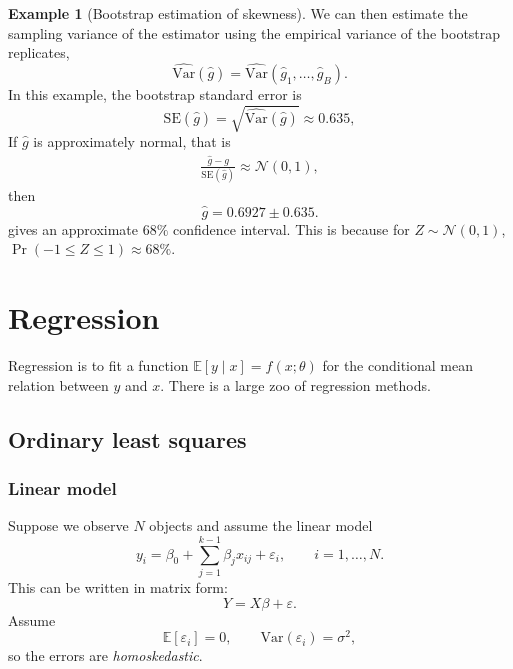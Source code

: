 \documentclass[11pt, titlepage]{article} %
\numberwithin{equation}{section}
\theoremstyle{definition}
\newtheorem*{example*}{Example}
\numberwithin{assumption}{section}
\begin{document}
\begin{example*}[Bootstrap estimation of skewness]
We can then estimate the sampling variance of the estimator using the empirical variance of the bootstrap replicates,
\begin{equation*}
    \widehat{\mathrm{Var}}(\hat g)
    =
    \widehat{\mathrm{Var}}(\hat g_1,\dots,\hat g_B).
\end{equation*}
In this example, the bootstrap standard error is
\begin{equation*}
    \mathrm{SE}(\hat g)=\sqrt{\widehat{\mathrm{Var}}(\hat g)}\approx 0.635,
\end{equation*}
If $\hat g$ is approximately normal, that is
\begin{align*}
    \frac{\hat g-g}{\mathrm{SE}(\hat g)}\approx\mathcal{N}(0,1),
\end{align*}
then
\begin{equation*}
    \hat g = 0.6927 \pm 0.635.
\end{equation*}
gives an approximate $68\%$ confidence interval. This is because for $Z\sim\mathcal{N}(0,1)$, $\Pr(-1\le Z\le 1)\approx68\%$.




\end{example*}

\section{Regression}

Regression is to fit a function $\mathbb{E}[y\mid x]=f(x;\theta)$
for the conditional mean relation between $y$ and $x$.
There is a large zoo of regression methods. 

\subsection{Ordinary least squares}

\subsubsection*{Linear model}

Suppose we observe $N$ objects and assume the linear model
\begin{equation*}
    y_i=\beta_0+\sum_{j=1}^{k-1}\beta_j x_{ij}+\varepsilon_i,
    \qquad i=1,\dots,N.
\end{equation*}
This can be written in matrix form:
\begin{equation*}
    Y=X\beta+\varepsilon.
\end{equation*}
Assume
\begin{equation*}
    \mathbb{E}[\varepsilon_i]=0,
    \qquad
    \mathrm{Var}(\varepsilon_i)=\sigma^2,
\end{equation*}
so the errors are \textit{homoskedastic}.
\end{document}

